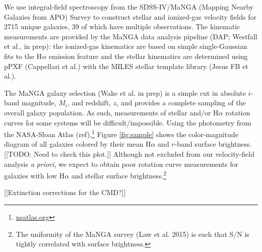 \documentclass[apj,iop,revtex4,numberedappendix]{emulateapj}
\begin{document}
We use integral-field spectroscopy from the SDSS-IV/MaNGA (Mapping
Nearby Galaxies from APO) Survey to construct stellar and ionized-gas
velocity fields for 2715 unique galaxies, 39 of which have multiple
observations.  The kinematic measurements are provided by the MaNGA data
analysis pipeline (DAP; Westfall et al., in prep): the ionized-gas
kinematics are based on simple single-Gaussian fits to the H$\alpha$
emission feature and the stellar kinematics are determined using pPXF
(Cappellari et al.) with the MILES stellar template library (Jesus FB et
al.).

The MaNGA galaxy selection (Wake et al. in prep) is a simple cut in
absolute $i$-band magnitude, $M_i$, and redshift, $z$, and provides a
complete sampling of the overall galaxy population.  As such,
measurements of stellar and/or H$\alpha$ rotation curves for some
systems will be difficult/impossible.  Using the photometry from the
NASA-Sloan Atlas (ref),\footnote{\url{nsatlas.org}} Figure
\ref{fig:sample} shows the color-magnitude diagram of all galaxies
colored by their mean H$\alpha$ and $r$-band surface brightness.
[[TODO: Need to check this plot.]] Although not excluded from our
velocity-field analysis {\em a priori}, we expect to obtain poor
rotation curve measurements for galaxies with low H$\alpha$ and stellar
surface brightness.\footnote{
%
The uniformity of the MaNGA survey (Law et al. 2015) is such that S/N is
tightly correlated with surface brightness.}

[[Extinction corrections for the CMD?]]
\end{document}
